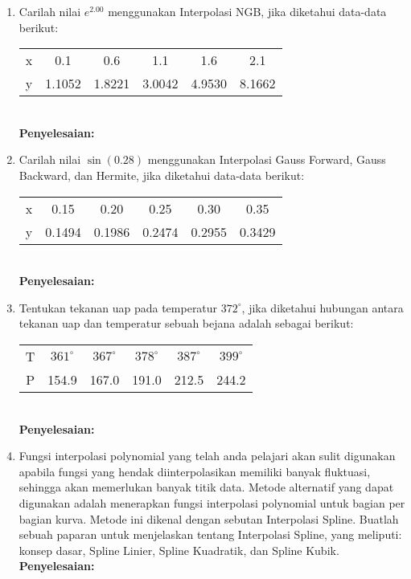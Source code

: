 \documentclass{article}
\newcommand{\penyelesaian}{\textbf{Penyelesaian: }}
\begin{document}
\begin{enumerate}
    \item Carilah nilai $e^{\num{2,00}}$ menggunakan Interpolasi NGB, jika diketahui data-data berikut: \\
    \begin{tabular}{ c c c c c c }
        x & \num{0,1} & \num{0,6} & \num{1,1} & \num{1,6} & \num{2,1} \\
        y & \num{1,1052} & \num{1,8221} & \num{3,0042} & \num{4,9530} & \num{8,1662} \\
    \end{tabular} \\
    \penyelesaian 

    \item Carilah nilai $\sin(\num{0,28})$ menggunakan Interpolasi Gauss Forward, Gauss Backward, dan Hermite, jika diketahui data-data berikut: \\
    \begin{tabular}{ c c c c c c }
        x & \num{0,15} & \num{0,20} & \num{0,25} & \num{0,30} & \num{0,35} \\
        y & \num{0,1494} & \num{0,1986} & \num{0,2474} & \num{0,2955} & \num{0,3429} \\
    \end{tabular} \\
    \penyelesaian

    \item Tentukan tekanan uap pada temperatur $372^{\circ}$, jika diketahui hubungan antara tekanan uap dan temperatur sebuah bejana adalah sebagai berikut: \\
        \begin{tabular}{ c c c c c c }
        T & $361^{\circ}$ & $367^{\circ}$ & $378^{\circ}$ & $387^{\circ}$ & $399^{\circ}$ \\
        P & \num{154,9} & \num{167,0} & \num{191,0} & \num{212,5} & \num{244,2} \\
    \end{tabular} \\
    \penyelesaian

    \item Fungsi interpolasi polynomial yang telah anda pelajari akan sulit digunakan apabila fungsi yang hendak diinterpolasikan memiliki banyak fluktuasi, sehingga akan memerlukan banyak titik data.
    Metode alternatif yang dapat digunakan adalah menerapkan fungsi interpolasi polynomial untuk bagian per bagian kurva. 
    Metode ini dikenal dengan sebutan Interpolasi Spline. Buatlah sebuah paparan untuk menjelaskan tentang Interpolasi Spline, yang meliputi: konsep dasar, Spline Linier, Spline Kuadratik, dan Spline Kubik. \\
    \penyelesaian

\end{enumerate}
\end{document}

